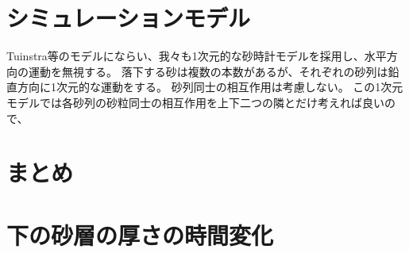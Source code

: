 \documentclass[dvipdfmx]{article}
\begin{document}
\section{シミュレーションモデル}


Tuinstra等のモデルにならい、我々も1次元的な砂時計モデルを採用し、水平方向の運動を無視する。
落下する砂は複数の本数があるが、それぞれの砂列は鉛直方向に1次元的な運動をする。
砂列同士の相互作用は考慮しない。
この1次元モデルでは各砂列の砂粒同士の相互作用を上下二つの隣とだけ考えれば良いので、



\section{まとめ}
%



 


\appendix

\section{下の砂層の厚さの時間変化}\label{250919092352}
\end{document}
